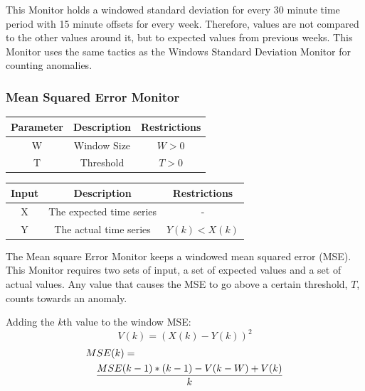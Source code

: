\documentclass[12pt]{ucthesis}
\begin{document}
This Monitor holds a windowed standard deviation for every 30 minute time period with 15 minute offsets
for every week. Therefore, values are not compared to the other values around it, but to expected values from
previous weeks. This Monitor uses the same tactics as the Windows Standard Deviation Monitor for counting anomalies.

\subsubsection{Mean Squared Error Monitor}
\label{outage-detection-monitors-MSE}
\begin{table}[H]
   \begin{center}
      \begin{tabular}{|c|c|c|}
         \hline
            Parameter & Description & Restrictions \\
         \hline
            W & Window Size & $ W > 0 $\\
         \hline
            T & Threshold & $ T > 0 $\\
         \hline
      \end{tabular}
   \end{center}
\end{table}

\begin{table}[H]
   \begin{center}
      \begin{tabular}{|c|c|c|}
         \hline
            Input & Description & Restrictions \\
         \hline
            X & The expected time series & - \\
         \hline
            Y & The actual time series & $ Y(k) < X(k) $ \\
         \hline
      \end{tabular}
   \end{center}
\end{table}

The Mean square Error Monitor keeps a windowed mean squared error (MSE). This Monitor requires two sets of input, a set
of expected values and a set of actual values. Any value that causes the MSE to go above a certain threshold, $T$,
counts towards an anomaly.

Adding the $k$th value to the window MSE:
$$
   V(k) = (X(k) - Y(k))^{2}
$$
\begin{eqnarray*}
   \lefteqn{MSE(k) = }\\
   && \frac{MSE(k - 1) * (k - 1) - V(k - W) + V(k)}{k}
\end{eqnarray*}
\end{document}
